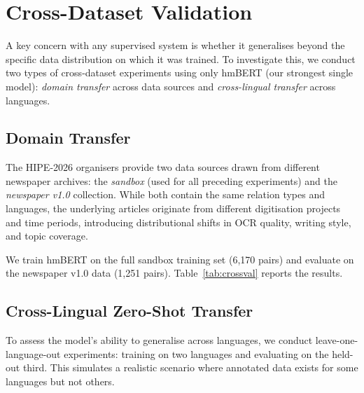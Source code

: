 

\section{Cross-Dataset Validation}
\label{sec:crossval}

A key concern with any supervised system is whether it generalises beyond the specific data distribution on which it was trained. To investigate this, we conduct two types of cross-dataset experiments using only hmBERT (our strongest single model): \emph{domain transfer} across data sources and \emph{cross-lingual transfer} across languages.

\subsection{Domain Transfer}

The HIPE-2026 organisers provide two data sources drawn from different newspaper archives: the \emph{sandbox} (used for all preceding experiments) and the \emph{newspaper v1.0} collection. While both contain the same relation types and languages, the underlying articles originate from different digitisation projects and time periods, introducing distributional shifts in OCR quality, writing style, and topic coverage.

We train hmBERT on the full sandbox training set (6,170 pairs) and evaluate on the newspaper v1.0 data (1,251 pairs). Table~\ref{tab:crossval} reports the results.

\subsection{Cross-Lingual Zero-Shot Transfer}

To assess the model's ability to generalise across languages, we conduct leave-one-language-out experiments: training on two languages and evaluating on the held-out third. This simulates a realistic scenario where annotated data exists for some languages but not others.

